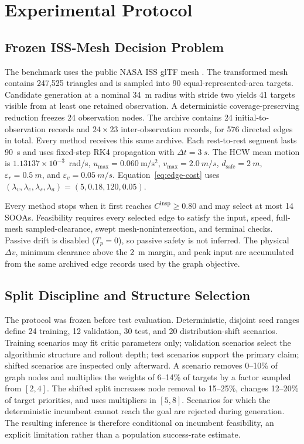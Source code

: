 \documentclass{IEEEtaes}
\newcommand{\dt}{\Delta t}
\newcommand{\unit}[2]{#1~#2}
\theoremstyle{remark}
\theoremstyle{plain}
\begin{document}
\section{Experimental Protocol}
\label{sec:simulation}

\subsection{Frozen ISS-Mesh Decision Problem}

The benchmark uses the public NASA ISS glTF mesh \cite{nasa_iss_gltf_model}. The transformed mesh contains 247,525 triangles and is sampled into 90 equal-represented-area targets. Candidate generation at a nominal \unit{34}{m} radius with stride two yields 41 targets visible from at least one retained observation. A deterministic coverage-preserving reduction freezes 24 observation nodes. The archive contains 24 initial-to-observation records and $24\times23$ inter-observation records, for 576 directed edges in total. Every method receives this same archive. Each rest-to-rest segment lasts \unit{90}{s} and uses fixed-step RK4 propagation with $\dt=\unit{3}{s}$. The HCW mean motion is $1.13137\times10^{-3}$~rad/s, $u_{\max}=0.060~\mathrm{m/s^2}$, $v_{\max}=\unit{2.0}{m/s}$, $d_{\mathrm{safe}}=\unit{2}{m}$, $\varepsilon_r=\unit{0.5}{m}$, and $\varepsilon_v=\unit{0.05}{m/s}$. Equation~\eqref{eq:edge-cost} uses $(\lambda_v,\lambda_e,\lambda_s,\lambda_a)=(5,0.18,120,0.05)$.

Every method stops when it first reaches $C^{\mathrm{insp}}\ge0.80$ and may select at most 14 SOOAs. Feasibility requires every selected edge to satisfy the input, speed, full-mesh sampled-clearance, swept mesh-nonintersection, and terminal checks. Passive drift is disabled ($T_p=0$), so passive safety is not inferred. The physical $\Delta v$, minimum clearance above the \unit{2}{m} margin, and peak input are accumulated from the same archived edge records used by the graph objective.

\subsection{Split Discipline and Structure Selection}

The protocol was frozen before test evaluation. Deterministic, disjoint seed ranges define 24 training, 12 validation, 30 test, and 20 distribution-shift scenarios. Training scenarios may fit critic parameters only; validation scenarios select the algorithmic structure and rollout depth; test scenarios support the primary claim; shifted scenarios are inspected only afterward. A scenario removes 0--10\% of graph nodes and multiplies the weights of 6--14\% of targets by a factor sampled from $[2,4]$. The shifted split increases node removal to 15--25\%, changes 12--20\% of target priorities, and uses multipliers in $[5,8]$. Scenarios for which the deterministic incumbent cannot reach the goal are rejected during generation. The resulting inference is therefore conditional on incumbent feasibility, an explicit limitation rather than a population success-rate estimate.
\end{document}
